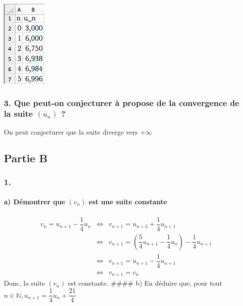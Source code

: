 \documentclass[]{scrartcl}
\let\oldparagraph\paragraph
\renewcommand{\paragraph}[1]{\oldparagraph{#1}\mbox{}}
\begin{document}
\includegraphics[scale=0.5]{images/tableur.png}

\hypertarget{que-peut-on-conjecturer-uxe0-propose-de-la-convergence-de-la-suite-u_n}{%
\subsubsection{\texorpdfstring{3. Que peut-on conjecturer à propose de
la convergence de la suite \((u_n)\)
?}{3. Que peut-on conjecturer à propose de la convergence de la suite (u\_n) ?}}\label{que-peut-on-conjecturer-uxe0-propose-de-la-convergence-de-la-suite-u_n}}

On peut conjecturer que la suite diverge vers \(+\infty\)

\hypertarget{partie-b}{%
\subsection{Partie B}\label{partie-b}}

\hypertarget{section}{%
\subsubsection{1.}\label{section}}

\hypertarget{a-duxe9montrer-que-v_n-est-une-suite-constante}{%
\paragraph{\texorpdfstring{a) Démontrer que \((v_n)\) est une suite
constante}{a) Démontrer que (v\_n) est une suite constante}}\label{a-duxe9montrer-que-v_n-est-une-suite-constante}}

\[
\begin{array}{rcl}
    v_n = u_{n+1} - \dfrac{1}{4}u_n & \iff & v_{n+1} = u_{n+2} + \dfrac{1}{4}u_{n+1}\\
        &\iff& v_{n+1} = \left(\dfrac{5}{4}u_{n+1} - \dfrac{1}{4}u_n\right) - \dfrac{1}{4}u_{n+1}\\
        &\iff& v_{n+1} = u_{n+1} - \dfrac{1}{4}u_{n+1}\\
        &\iff& v_{n+1} = v_n
\end{array}
\] Donc, la suite \((v_n)\) est constante. \#\#\#\# b) En déduire que,
pour tout \(n\in\mathbb{N}, u_{n+1} = \dfrac{1}{4}u_n + \dfrac{21}{4}\)
\end{document}
